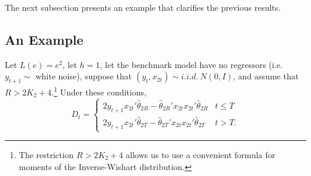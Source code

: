 \documentclass[11pt]{article}
\begin{document}
The next subsection presents an example that clarifies the previous
results.

\subsection{An Example}\label{sec:example}

Let $L(e) = e^2$, let $h
= 1$, let the benchmark model have no regressors (i.e. $y_{t+1} \sim$
white noise), suppose that $(y_{t}, x_{2t}) \sim i.i.d.\ N(0,I)$, and
assume that $R > 2K_2 + 4$.\footnote{The restriction $R > 2 K_2 + 4$
  allows us to use a convenient formula for moments of the
  Inverse-Wishart distribution.}  Under these conditions,
\begin{equation*}
  D_t =
  \begin{cases}
    2 y_{t+1} x_{2t}'\hat{\theta}_{2R} -
    \hat{\theta}_{2R}' x_{2t} x_{2t}' \hat{\theta}_{2R} & t \leq T \\
    2 y_{t+1} x_{2t}'\hat{\theta}_{2T} -
    \hat{\theta}_{2T}' x_{2t} x_{2t}' \hat{\theta}_{2T} & t > T.
  \end{cases}
\end{equation*}
\end{document}
